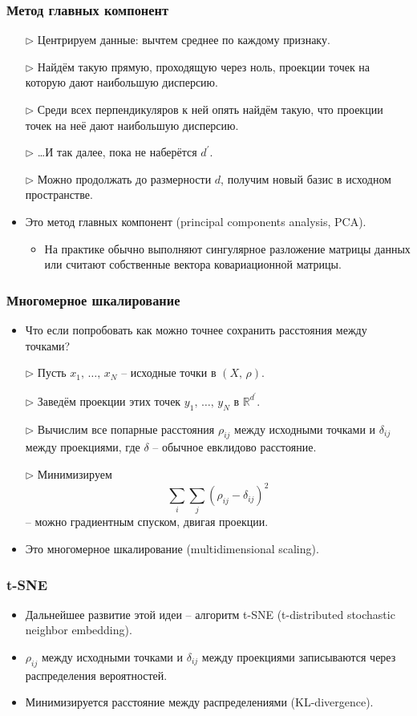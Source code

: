 \documentclass[unicode]{beamer}
\begin{document}
\begin{frame}[t]
\frametitle{Метод главных компонент}
\begin{itemize}
\item[$\rhd$] Центрируем данные: вычтем среднее по каждому признаку.
\item[$\rhd$] Найдём такую прямую, проходящую через ноль, проекции точек на которую дают наибольшую дисперсию.
\item[$\rhd$] Среди всех перпендикуляров к ней опять найдём такую, что проекции точек на неё дают наибольшую дисперсию.
\item[$\rhd$] \dots И так далее, пока не наберётся $d^\prime$.
\item[$\rhd$] Можно продолжать до размерности $d$, получим новый базис в исходном пространстве.
\item Это метод главных компонент (principal components analysis, PCA).
  \begin{itemize}
  \item На практике обычно выполняют сингулярное разложение матрицы данных или считают собственные вектора ковариационной матрицы.
  \end{itemize}
\end{itemize}
\end{frame}

\begin{frame}[t]
\frametitle{Многомерное шкалирование}
\begin{itemize}
\item Что если попробовать как можно точнее сохранить расстояния между точками?
\item[$\rhd$] Пусть $x_1,\, \dots,\, x_N$ – исходные точки в $(X,\, \rho)$.
\item[$\rhd$] Заведём проекции этих точек $y_1,\, \dots,\, y_N$ в $\mathbb{R}^{d^\prime}$.
\item[$\rhd$] Вычислим все попарные расстояния $\rho_{ij}$ между исходными точками и $\delta_{ij}$ между проекциями, где $\delta$ -- обычное евклидово расстояние.
\item[$\rhd$] Минимизируем
$$
\sum_i \sum_j \left(\rho_{ij} - \delta_{ij}\right)^2
$$
-- можно градиентным спуском, двигая проекции.
\item Это многомерное шкалирование (multidimensional scaling).
\end{itemize}
\end{frame}

\begin{frame}[t]
\frametitle{t-SNE}
\begin{itemize}
\item Дальнейшее развитие этой идеи – алгоритм t-SNE (t-distributed stochastic neighbor embedding).
\item $\rho_{ij}$ между исходными точками и $\delta_{ij}$ между проекциями записываются через распределения вероятностей.
\item Минимизируется расстояние между распределениями (KL-divergence).
\end{itemize}
\end{frame}
\end{document}
